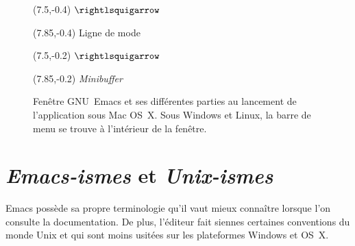 \begin{figure}[t]
  \begin{textblock}{0.35}(7.5,-0.4)
    \LARGE$\rightlsquigarrow$
  \end{textblock}
  \begin{textblock}{1.75}(7.85,-0.4)
    \small Ligne de mode
  \end{textblock}

  \begin{textblock}{0.35}(7.5,-0.2)
    \LARGE$\rightlsquigarrow$
  \end{textblock}
  \begin{textblock}{1.75}(7.85,-0.2)
    \small \emph{Minibuffer}
  \end{textblock}
  \caption{Fenêtre GNU~Emacs et ses différentes parties au lancement
    de l'application sous Mac OS~X. Sous Windows et Linux, la barre de
    menu se trouve à l'intérieur de la fenêtre.}
  \label{fig:ess:emacswindow}
\end{figure}


\section{\emph{Emacs-ismes} et \emph{Unix-ismes}}
\label{emacs+ess:ismes}

Emacs possède sa propre terminologie qu'il vaut mieux connaître
lorsque l'on consulte la documentation. De plus, l'éditeur fait
siennes certaines conventions du monde Unix et qui sont moins usitées
sur les plateformes Windows et OS~X.

